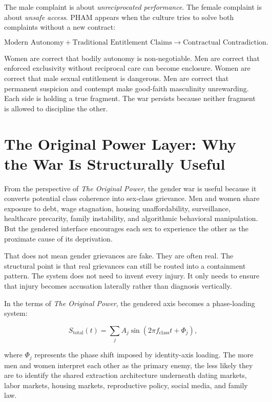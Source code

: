 \documentclass[12pt]{article}
\newcommand{\OP}{\textit{The Original Power}}
\begin{document}
The male complaint is about \textit{unreciprocated performance}. The female complaint is about \textit{unsafe access}. PHAM appears when the culture tries to solve both complaints without a new contract:

\begin{equation}
  \text{Modern Autonomy} + \text{Traditional Entitlement Claims}
  \rightarrow \text{Contractual Contradiction}.
\end{equation}

Women are correct that bodily autonomy is non-negotiable. Men are correct that enforced exclusivity without reciprocal care can become enclosure. Women are correct that male sexual entitlement is dangerous. Men are correct that permanent suspicion and contempt make good-faith masculinity unrewarding. Each side is holding a true fragment. The war persists because neither fragment is allowed to discipline the other.

\section{The Original Power Layer: Why the War Is Structurally Useful}

From the perspective of \OP, the gender war is useful because it converts potential class coherence into sex-class grievance. Men and women share exposure to debt, wage stagnation, housing unaffordability, surveillance, healthcare precarity, family instability, and algorithmic behavioral manipulation. But the gendered interface encourages each sex to experience the other as the proximate cause of its deprivation.

That does not mean gender grievances are fake. They are often real. The structural point is that real grievances can still be routed into a containment pattern. The system does not need to invent every injury. It only needs to ensure that injury becomes accusation laterally rather than diagnosis vertically.

In the terms of \OP, the gendered axis becomes a phase-loading system:

\begin{equation}
  S_{\text{total}}(t) =
  \sum_j A_j \sin(2\pi f_{\text{class}}t + \Phi_j),
\end{equation}

where $\Phi_j$ represents the phase shift imposed by identity-axis loading. The more men and women interpret each other as the primary enemy, the less likely they are to identify the shared extraction architecture underneath dating markets, labor markets, housing markets, reproductive policy, social media, and family law.
\end{document}

